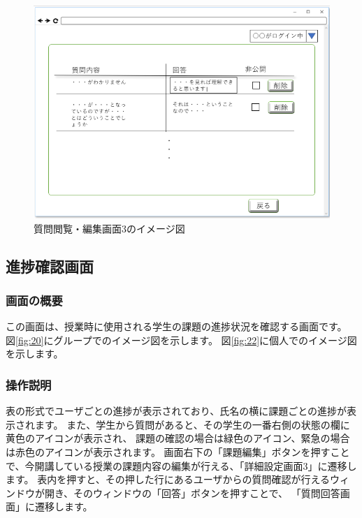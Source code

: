 \begin{figure}[htbp]
\begin{minipage}{0.5\hsize}
 \end{minipage}
 \begin{minipage}{0.5\hsize}
  \begin{center}
   \includegraphics[width=1\linewidth,clip]{./img/000.png}
  \end{center}
 \end{minipage}
 \caption{質問閲覧・編集画面3のイメージ図}\label{fig:19}
\end{figure}

\newpage

\subsection{進捗確認画面}
\subsubsection{画面の概要}
この画面は、授業時に使用される学生の課題の進捗状況を確認する画面です。
図\ref{fig:20}にグループでのイメージ図を示します。
図\ref{fig:22}に個人でのイメージ図を示します。

\subsubsection{操作説明}
表の形式でユーザごとの進捗が表示されており、氏名の横に課題ごとの進捗が表示されます。%
また、学生から質問があると、その学生の一番右側の状態の欄に黄色のアイコンが表示され、
課題の確認の場合は緑色のアイコン、緊急の場合は赤色のアイコンが表示されます。
画面右下の「課題編集」ボタンを押すことで、今開講している授業の課題内容の編集が行える、「詳細設定画面3」に遷移します。
表内を押すと、その押した行にあるユーザからの質問確認が行えるウィンドウが開き、そのウィンドウの「回答」ボタンを押すことで、%
「質問回答画面」に遷移します。

